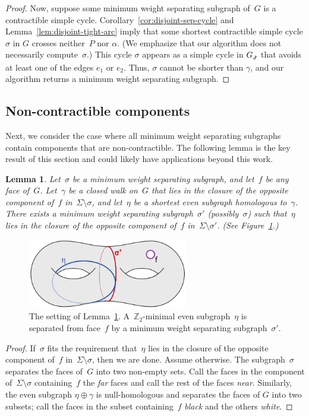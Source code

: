 \documentclass[11pt,twoside]{article}
\def\Z{\mathbb{Z}}
\def\subsnip{\mathbin{\raisebox{0.15ex}{\rotatebox[origin=c]{60}{\footnotesize\Rightscissors}\!}}}
\def\Gsnip{\mathord{G_{\subsnip}}}
\newtheorem{lemma}[theorem]{Lemma}
\begin{document}
{\begin{proof}
Now, suppose some minimum weight separating subgraph of~$G$ is a contractible simple cycle. Corollary~\ref{cor:disjoint-sep-cycle} and Lemma~\ref{lem:disjoint-tight-arc} imply that some shortest contractible simple cycle $\sigma$ in $G$ crosses neither~$P$ nor $\alpha$.  (We emphasize that our algorithm does not necessarily compute~$\sigma$.)  This cycle $\sigma$ appears as a simple cycle in $\Gsnip$ that avoids at least one of the edges $e_1$ or $e_2$.  Thus, $\sigma$ cannot be shorter than $\gamma$, and our algorithm returns a minimum weight separating subgraph.
\end{proof}


\subsection{Non-contractible components}
\label{sec:global_non-contractible}
Next, we consider the case where all minimum weight separating subgraphs contain components that are non-contractible. The following lemma is the key result of this section and could likely have applications beyond this work.
\begin{lemma}
\label{lem:global_split-nocross}
Let~$\sigma$ be a minimum weight separating subgraph, and let~$f$ be any face of~$G$.
Let~$\gamma$ be a closed walk on~$G$ that lies in the closure of the opposite component of~$f$ in~$\Sigma \setminus \sigma$, and let~$\eta$
be a shortest even subgraph homologous to~$\gamma$.
There exists a minimum weight separating subgraph~$\sigma'$ (possibly~$\sigma$) such
that~$\eta$ lies in the closure of the opposite component of~$f$ in~$\Sigma \setminus \sigma'$. (See Figure~\ref{fig:global_nonsep-vs-shortsep}.)
\end{lemma}
\begin{figure}[ht]
\centering
\includegraphics[height=1.2in]{Fig/nonsep-vs-shortsep}
\caption{The setting of Lemma~\ref{lem:global_split-nocross}. A~$\Z_2$-minimal even subgraph~$\eta$ is separated from face~$f$ by a minimum weight separating subgraph~$\sigma'$.}
\label{fig:global_nonsep-vs-shortsep}
\end{figure}
\begin{proof}
If~$\sigma$ fits the requirement that~$\eta$ lies in the closure of the opposite component of~$f$ in~$\Sigma \setminus \sigma$, then we are done. Assume otherwise.
The subgraph~$\sigma$ separates the faces of~$G$ into two non-empty sets.  Call the faces in the component of~$\Sigma \setminus \sigma$ containing~$f$ the \emph{far} faces and call the rest of the faces  \emph{near}.  Similarly, the even subgraph $\eta \oplus \gamma$ is null-homologous and separates the faces of $G$ into two subsets; call the faces in the subset containing~$f$ \emph{black} and the others \emph{white}.


\end{proof}}
\end{document}
